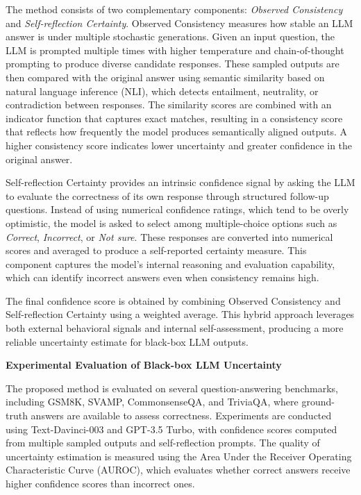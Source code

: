 The method consists of two complementary components: \emph{Observed Consistency} and \emph{Self-reflection Certainty}. Observed Consistency measures how stable an LLM answer is under multiple stochastic generations. Given an input question, the LLM is prompted multiple times with higher temperature and chain-of-thought prompting to produce diverse candidate responses. These sampled outputs are then compared with the original answer using semantic similarity based on natural language inference (NLI), which detects entailment, neutrality, or contradiction between responses. The similarity scores are combined with an indicator function that captures exact matches, resulting in a consistency score that reflects how frequently the model produces semantically aligned outputs. A higher consistency score indicates lower uncertainty and greater confidence in the original answer.

Self-reflection Certainty provides an intrinsic confidence signal by asking the LLM to evaluate the correctness of its own response through structured follow-up questions. Instead of using numerical confidence ratings, which tend to be overly optimistic, the model is asked to select among multiple-choice options such as \emph{Correct}, \emph{Incorrect}, or \emph{Not sure}. These responses are converted into numerical scores and averaged to produce a self-reported certainty measure. This component captures the model's internal reasoning and evaluation capability, which can identify incorrect answers even when consistency remains high.

The final confidence score is obtained by combining Observed Consistency and Self-reflection Certainty using a weighted average. This hybrid approach leverages both external behavioral signals and internal self-assessment, producing a more reliable uncertainty estimate for black-box LLM outputs.

\textbf{Experimental Evaluation of Black-box LLM Uncertainty}

The proposed method is evaluated on several question-answering benchmarks, including GSM8K, SVAMP, CommonsenseQA, and TriviaQA, where ground-truth answers are available to assess correctness. Experiments are conducted using Text-Davinci-003 and GPT-3.5 Turbo, with confidence scores computed from multiple sampled outputs and self-reflection prompts. The quality of uncertainty estimation is measured using the Area Under the Receiver Operating Characteristic Curve (AUROC), which evaluates whether correct answers receive higher confidence scores than incorrect ones.

